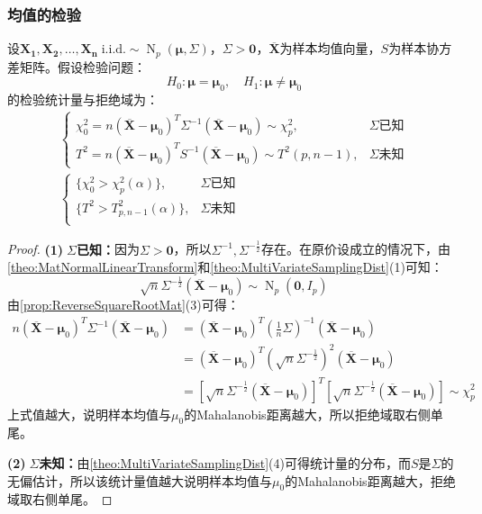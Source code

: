 \subsubsection{均值的检验}
\begin{theorem}
	设$\mathbf{X_1},\mathbf{X_2},\dots,\mathbf{X_n}\;\text{i.i.d.}\sim\operatorname{N}_p(\boldsymbol{\mu},\Sigma)$，$\Sigma>\mathbf{0}$，$\overline{\mathbf{X}}$为样本均值向量，$S$为样本协方差矩阵。假设检验问题：
	\begin{equation*}
		H_0:\boldsymbol{\mu}=\boldsymbol{\mu}_0,\quad H_1:\boldsymbol{\mu}\ne\boldsymbol{\mu}_0
	\end{equation*}
	的检验统计量与拒绝域为：
	\begin{gather*}
		\begin{cases}
			\chi_0^2=n(\overline{\mathbf{X}}-\boldsymbol{\mu}_0)^T\Sigma^{-1}(\overline{\mathbf{X}}-\boldsymbol{\mu}_0)\sim\chi_p^2,&\Sigma\text{已知} \\
			T^2=n(\overline{\mathbf{X}}-\boldsymbol{\mu}_0)^TS^{-1}(\overline{\mathbf{X}}-\boldsymbol{\mu}_0)\sim T^2(p,n-1),&\Sigma\text{未知}
		\end{cases} \\
		\begin{cases}
			\{\chi_0^2>\chi_p^2(\alpha)\},&\Sigma\text{已知} \\
			\{T^2>T^2_{p,n-1}(\alpha)\},&\Sigma\text{未知} \\
		\end{cases}
	\end{gather*}
\end{theorem}
\begin{proof}
	\textbf{(1)$\;\Sigma$已知：}因为$\Sigma>\mathbf{0}$，所以$\Sigma^{-1},\Sigma^{-\frac{1}{2}}$存在。在原价设成立的情况下，由\cref{theo:MatNormalLinearTransform}和\cref{theo:MultiVariateSamplingDist}(1)可知：
	\begin{equation*}
		\sqrt{n}\Sigma^{-\frac{1}{2}}(\overline{\mathbf{X}}-\boldsymbol{\mu}_0)\sim\operatorname{N}_p(\mathbf{0},I_p)
	\end{equation*}
	由\cref{prop:ReverseSquareRootMat}(3)可得：
	\begin{align*}
		n(\overline{\mathbf{X}}-\boldsymbol{\mu}_0)^T\Sigma^{-1}(\overline{\mathbf{X}}-\boldsymbol{\mu}_0)
		&=(\overline{\mathbf{X}}-\boldsymbol{\mu}_0)^T\left(\frac{1}{n}\Sigma\right)^{-1}(\overline{\mathbf{X}}-\boldsymbol{\mu}_0) \\
		&=(\overline{\mathbf{X}}-\boldsymbol{\mu}_0)^T\left(\sqrt{n}\Sigma^{-\frac{1}{2}}\right)^{2}(\overline{\mathbf{X}}-\boldsymbol{\mu}_0) \\
		&=[\sqrt{n}\Sigma^{-\frac{1}{2}}(\overline{\mathbf{X}}-\boldsymbol{\mu}_0)]^T[\sqrt{n}\Sigma^{-\frac{1}{2}}(\overline{\mathbf{X}}-\boldsymbol{\mu}_0)]\sim\chi^2_p
	\end{align*}
	上式值越大，说明样本均值与$\mu_0$的Mahalanobis距离越大，所以拒绝域取右侧单尾。\par
	\textbf{(2)$\;\Sigma$未知：}由\cref{theo:MultiVariateSamplingDist}(4)可得统计量的分布，而$S$是$\Sigma$的无偏估计，所以该统计量值越大说明样本均值与$\mu_0$的Mahalanobis距离越大，拒绝域取右侧单尾。
\end{proof}
